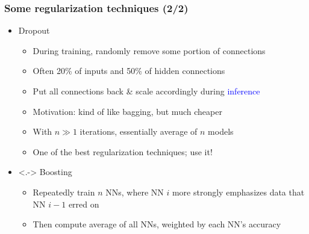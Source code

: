 \begin{frame}
    \frametitle{Some regularization techniques (2/2)}
    \begin{itemize}
        \item<+-> \alert{Dropout} \citep{SrivastavaJMLR14}
        \begin{itemize}[<.->]
            \item During \textcolor{Green4}{training}, randomly remove some portion of connections
            \item Often 20\% of inputs and 50\% of hidden connections
            \item<+-> Put all connections back \& scale accordingly during \textcolor{blue}{inference}
            \item<+-> Motivation: kind of like bagging, but much cheaper
            \item With $n \gg 1$ iterations, essentially average of $n$ models
            \item One of the best regularization techniques; use it!
        \end{itemize}
    \end{itemize}

    
    \hfill
    
    \hfill
    
    \hfill

    \begin{itemize}
        \item<.-> Boosting \citep[e.g.,][]{FreundJCSS97}
        \begin{itemize}
            \item Repeatedly train $n$ NNs, where NN $i$ more strongly emphasizes data that NN $i - 1$ erred on
            \item Then compute average of all NNs, weighted by each NN's accuracy
        \end{itemize}
    \end{itemize}
\end{frame}

